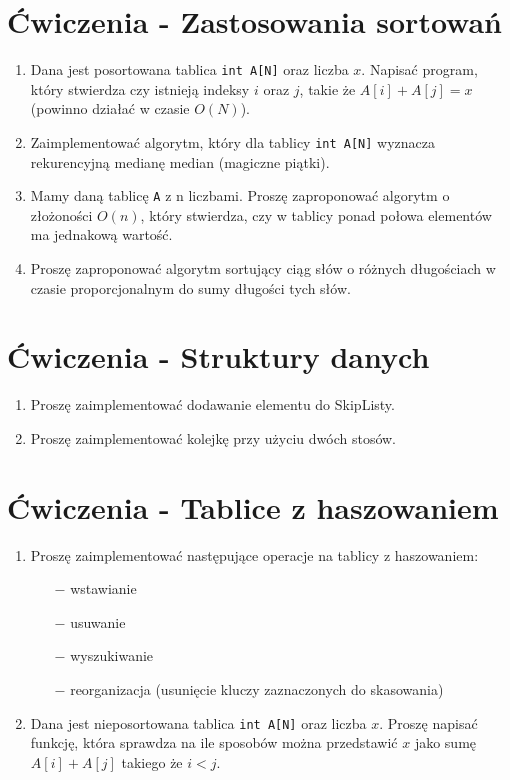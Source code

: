 \documentclass[11pt]{article}
\begin{document}
\newpage
\section{Ćwiczenia - Zastosowania sortowań}

\begin{enumerate}
	\item Dana jest posortowana tablica \texttt{int A[N]} oraz liczba $x$.
	Napisać program, który stwierdza czy istnieją indeksy $i$ oraz $j$,
	takie że $A[i]+A[j]=x$ (powinno działać w czasie $O(N)$).
	
	\item Zaimplementować algorytm, który dla tablicy \texttt{int A[N]} wyznacza
	rekurencyjną medianę median (magiczne piątki).
	
	\item Mamy daną tablicę \texttt{A} z n liczbami. Proszę zaproponować algorytm
	o złożoności $O(n)$, który stwierdza, czy w tablicy ponad połowa elementów
	ma jednakową wartość.
	
	\item Proszę zaproponować algorytm sortujący ciąg słów o różnych długościach
	w czasie proporcjonalnym do sumy długości tych słów.
\end{enumerate}

\section{Ćwiczenia - Struktury danych}

\begin{enumerate}
	\item Proszę zaimplementować dodawanie elementu do SkipListy.
	
	\item Proszę zaimplementować kolejkę przy użyciu dwóch stosów.
	
	
\end{enumerate}

\section{Ćwiczenia - Tablice z haszowaniem}

\begin{enumerate}
	
	\item Proszę zaimplementować następujące operacje na tablicy z haszowaniem:
	\begin{itemize}
		\item[$-$] wstawianie
		\item[$-$] usuwanie
		\item[$-$] wyszukiwanie
		\item[$-$] reorganizacja (usunięcie kluczy zaznaczonych do skasowania)
	\end{itemize}
	
	\item Dana jest nieposortowana tablica \texttt{int A[N]} oraz liczba $x$.
	Proszę napisać funkcję, która sprawdza na ile sposobów można przedstawić
	$x$ jako sumę $A[i]+A[j]$ takiego że $i<j$.
		
\end{enumerate}
\end{document}
